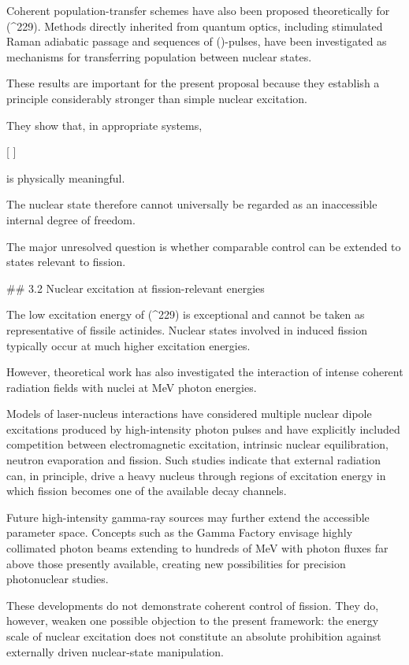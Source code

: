 Coherent population-transfer schemes have also been proposed theoretically for (^{229}). Methods directly inherited from quantum optics, including stimulated Raman adiabatic passage and sequences of (\pi)-pulses, have been investigated as mechanisms for transferring population between nuclear states.

These results are important for the present proposal because they establish a principle considerably stronger than simple nuclear excitation.

They show that, in appropriate systems,

[
]

is physically meaningful.

The nuclear state therefore cannot universally be regarded as an inaccessible internal degree of freedom.

The major unresolved question is whether comparable control can be extended to states relevant to fission.

## 3.2 Nuclear excitation at fission-relevant energies

The low excitation energy of (^{229}) is exceptional and cannot be taken as representative of fissile actinides. Nuclear states involved in induced fission typically occur at much higher excitation energies.

However, theoretical work has also investigated the interaction of intense coherent radiation fields with nuclei at MeV photon energies.

Models of laser-nucleus interactions have considered multiple nuclear dipole excitations produced by high-intensity photon pulses and have explicitly included competition between electromagnetic excitation, intrinsic nuclear equilibration, neutron evaporation and fission. Such studies indicate that external radiation can, in principle, drive a heavy nucleus through regions of excitation energy in which fission becomes one of the available decay channels.

Future high-intensity gamma-ray sources may further extend the accessible parameter space. Concepts such as the Gamma Factory envisage highly collimated photon beams extending to hundreds of MeV with photon fluxes far above those presently available, creating new possibilities for precision photonuclear studies.

These developments do not demonstrate coherent control of fission. They do, however, weaken one possible objection to the present framework: the energy scale of nuclear excitation does not constitute an absolute prohibition against externally driven nuclear-state manipulation.

